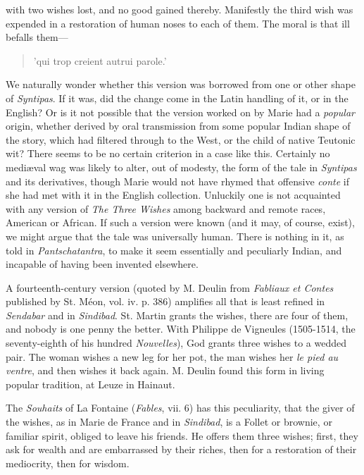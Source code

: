 \documentclass[14pt,a4paper]{memoir}
\begin{document}
{\textquotesingle with two wishes lost, and no good gained
thereby.\textquotesingle{} Manifestly the third wish was expended in a
restoration of human noses to each of them. The moral is that ill
befalls them---

\begin{verse}
'qui trop creient autrui parole.'
\end{verse}

We naturally wonder whether this version was borrowed from one or other
shape of \emph{Syntipas}. If it was, did the change come in the Latin
handling of it, or in the English? Or is it not possible that the
version worked on by Marie had a \emph{popular} origin, whether derived
by oral transmission from some popular Indian shape of the story, which
had filtered through to the West, or the child of native Teutonic wit?
There seems to be no certain criterion in a case like this. Certainly no
mediæval wag was likely to alter, out of modesty, the form of the tale
in \emph{Syntipas} and its derivatives, though Marie would not have
rhymed that offensive \emph{conte} if she had met with it in the English
collection. Unluckily one is not acquainted with any version of
\emph{The Three Wishes} among backward and remote races, American or
African. If such a version were known (and it may, of course, exist), we
might argue that the tale was \textquotesingle universally
human.\textquotesingle{} There is nothing in it, as told in
\emph{Pantschatantra}, to make it seem essentially and peculiarly
Indian, and incapable of having been invented elsewhere.

A fourteenth-century version (quoted by M. Deulin from \emph{Fabliaux et
Contes} published by St. Méon, vol. iv. p. 386) amplifies all that is
least refined in \emph{Sendabar} and in \emph{Sindibad}. St. Martin
grants the wishes, there are four of them, and nobody is one penny the
better. With Philippe de Vigneules (1505-1514, the seventy-eighth of his
hundred \emph{Nouvelles}), God grants three wishes to a wedded pair. The
woman wishes a new leg for her pot, the man wishes her \emph{le pied au
ventre}, and then wishes it back again. M. Deulin found this form in
living popular tradition, at Leuze in Hainaut.

The \emph{Souhaits} of La Fontaine (\emph{Fables}, vii. 6) has this
peculiarity, that the giver of the wishes, as in Marie de France and in
\emph{Sindibad}, is a Follet or brownie, or familiar spirit, obliged to
leave his friends. He offers them three wishes; first, they ask for
wealth and are embarrassed by their riches, then for a restoration of
their mediocrity, then for wisdom.

}
\end{document}
